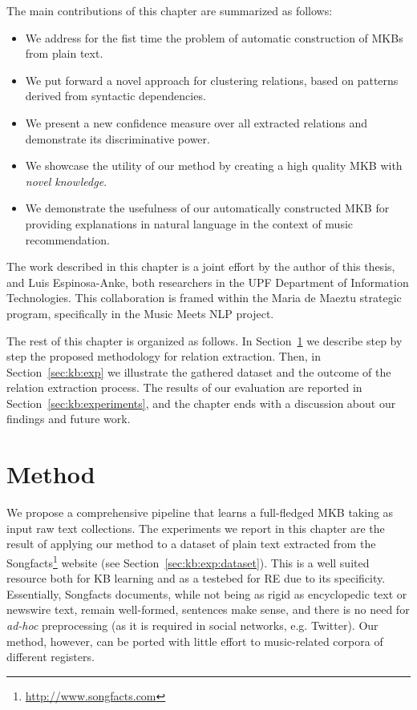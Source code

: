 The main contributions of this chapter are summarized as follows:
\begin{itemize}
    \item{We address for the fist time the problem of automatic construction of MKBs from plain text.}
    \item{We put forward a novel approach for clustering relations, based on patterns derived from syntactic dependencies.}
    \item{We present a new confidence measure over all extracted relations and demonstrate its discriminative power.}
    \item{We showcase the utility of our method by creating a high quality MKB with \textit{novel knowledge}.}
    \item{We demonstrate the usefulness of our automatically constructed MKB for providing explanations in natural language in the context of music recommendation.}
\end{itemize}

The work described in this chapter is a joint effort by the author of this thesis, and Luis Espinosa-Anke, both researchers in the UPF Department of Information Technologies. This collaboration is framed within the Maria de Maeztu strategic program, specifically in the Music Meets NLP project.

The rest of this chapter is organized as follows. In Section~\ref{sec:kb:method} we describe step by step the proposed methodology for relation extraction. Then, in Section~\ref{sec:kb:exp} we illustrate the gathered dataset and the outcome of the relation extraction process. The results of our evaluation are reported in Section~\ref{sec:kb:experiments}, and the chapter ends with a discussion about our findings and future work.


\section{Method}
\label{sec:kb:method}

We propose a comprehensive pipeline that learns a full-fledged \textsc{MKB} taking as input raw text collections. The experiments we report in this chapter are the result of applying our method to a dataset of plain text extracted from the Songfacts\footnote{\url{http://www.songfacts.com}} website (see Section~\ref{sec:kb:exp:dataset}). This is a well suited resource both for \textsc{KB} learning and as a testebed for \textsc{RE} due to its specificity. Essentially, Songfacts documents, while not being as rigid as encyclopedic text or newswire text, remain well-formed, sentences make sense, and there is no need for \textit{ad-hoc} preprocessing (as it is required in social networks, e.g. Twitter). Our method, however, can be ported with little effort to music-related corpora of different registers.

